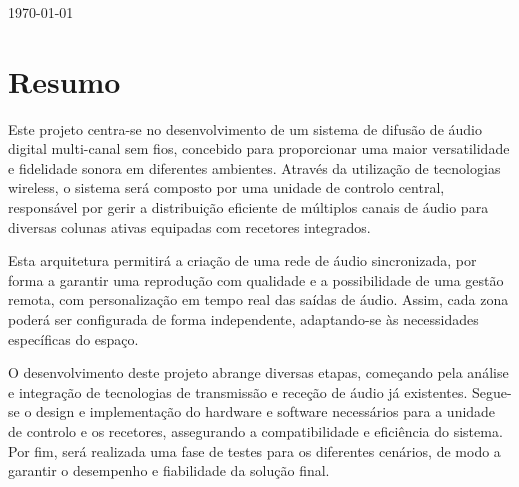\documentclass{article}
\begin{document}
\begin{titlepage}
\begin{center}
    \vspace*{3cm} %
    {\Huge\textbf{\titulo}}\\[1cm] %
    
    {\Large \subtitulo}\\[0.5cm]
    {\empresa}\\[2cm] %
    
    {\large \autores}\\[1cm]
    
    {\small \autorescontactos}\\[2cm]
    
    \date{\today}
    \today
\end{center}
\end{titlepage}

\clearpage
\setcounter{page}{1}
\tableofcontents

\clearpage

\hspace{5cm}


\section*{Resumo}

Este projeto centra-se no desenvolvimento de um sistema de difusão de áudio digital multi-canal sem fios, concebido para proporcionar uma maior versatilidade e fidelidade sonora em diferentes ambientes. Através da utilização de tecnologias wireless, o sistema será composto por uma unidade de controlo central, responsável por gerir a distribuição eficiente de múltiplos canais de áudio para diversas colunas ativas equipadas com recetores integrados.


Esta arquitetura permitirá a criação de uma rede de áudio sincronizada, por forma a garantir uma reprodução com qualidade e a possibilidade de uma gestão remota, com personalização em tempo real das saídas de áudio. Assim, cada zona poderá ser configurada de forma independente, adaptando-se às necessidades específicas do espaço.


O desenvolvimento deste projeto abrange diversas etapas, começando pela análise e integração de tecnologias de transmissão e receção de áudio já existentes. Segue-se o design e implementação do hardware e software necessários para a unidade de controlo e os recetores, assegurando a compatibilidade e eficiência do sistema. Por fim, será realizada uma fase de testes para os diferentes cenários, de modo a garantir o desempenho e fiabilidade da solução final.
\end{document}
